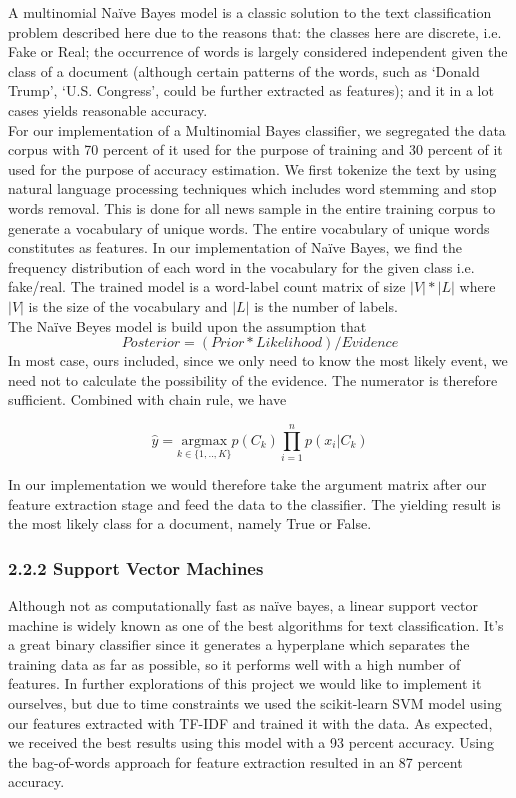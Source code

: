 \documentclass{neu_handout}
\begin{document}
A multinomial Na\"ive Bayes model is a classic solution to the text classification problem described here due to the reasons that: the classes here are discrete, i.e. Fake or Real; the occurrence of words is largely considered independent given the class of a document (although certain patterns of the words, such as ‘Donald Trump’, ‘U.S. Congress’, could be further extracted as features); and it in a lot cases yields reasonable accuracy.\\

For our implementation of a Multinomial Bayes classifier, we segregated the data corpus with 70 percent of it used for the purpose of training and 30 percent of it used for the purpose of accuracy estimation. We first tokenize the text by using  natural language processing techniques which includes word stemming and stop words removal. This is done for all news sample in the entire training corpus to generate a vocabulary of unique words. The entire vocabulary of unique words constitutes as features. In our implementation of Na\"ive Bayes, we find the frequency distribution of each word in the vocabulary for the given class i.e. fake/real. The trained model is a word-label count matrix of size $|V|*|L|$ where $|V|$ is the size of the vocabulary and $|L|$ is the number of labels. \\

The Na\"ive Beyes model is build upon the assumption that $$Posterior = (Prior * Likelihood) / Evidence$$
In most case, ours included, since we only need to know the most likely event, we need not to calculate the possibility of the evidence. The numerator is therefore sufficient. Combined with chain rule, we have 


$$ \hat{y} = \underset{k \in \{1,..,K\}}{\mathrm{argmax}} p(C_k) \prod_{i=1}^{n}  p (x_i | C_k) $$
	
In our implementation we would therefore take the argument matrix after our feature extraction stage and feed the data to the classifier. The yielding result is the most likely class for a document, namely True or False.


\subsubsection*{2.2.2 Support Vector Machines}

Although not as computationally fast as na\"ive bayes, a linear support vector machine is widely known as one of the best  algorithms for text classification. It's a great binary classifier since it generates a hyperplane which separates the training data as far as possible, so it performs well with a high number of features. In further explorations of this project we would like to implement it ourselves, but due to time constraints we used the scikit-learn SVM model using our features extracted with TF-IDF and trained it with the data. As expected, we received the best results using this model with a 93 percent accuracy. Using the bag-of-words approach for feature extraction resulted in an 87 percent accuracy.
\end{document}
